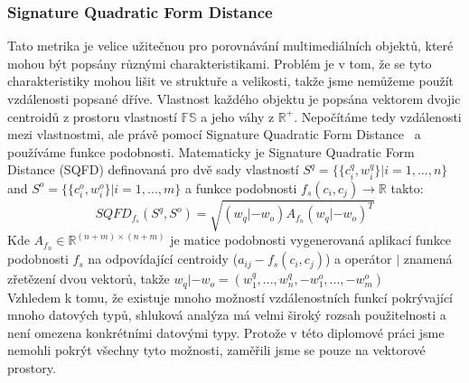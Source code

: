 \subsubsection{Signature Quadratic Form Distance}
Tato metrika je velice užitečnou pro porovnávání multimediálních objektů, které mohou být popsány různými charakteristikami. Problém je v tom, že se tyto charakteristiky mohou lišit ve struktuře a velikosti, takže jsme nemůžeme použít vzdálenosti popsané dříve. Vlastnost každého objektu je popsána vektorem dvojic centroidů z prostoru vlastností $\mathbb{FS}$ a jeho váhy z $\mathbb{R^{+}}$.
Nepočítáme tedy vzdálenosti mezi vlastnostmi, ale právě pomocí Signature Quadratic Form Distance~\cite{Beecks10} a používáme funkce podobnosti.
Matematicky je Signature Quadratic Form Distance (SQFD) definovaná pro dvě sady vlastností $S^{q} = \{\{c_i^q, w_i^q\}|i=1,...,n\}$ and $S^{o} = \{\{c_i^o, w_i^o\}|i=1,...,m\}$ a funkce podobnosti $f_s(c_i, c_j)\to \mathbb{R}$ takto:
$$SQFD_{f_s}(S^q,S^o)=\sqrt{(w_q|-w_o)A_{f_n}(w_q|-w_o)^T}$$
Kde $A_{f_n} \in \mathbb{R}^{(n+m)\times(n+m)}$ je matice podobnosti vygenerovaná aplikací funkce podobnosti $f_s$ na odpovídající centroidy  ($a_{ij}-f_s(c_i,c_j)$) a operátor $|$ znamená zřetězení dvou vektorů, takže $w_q|-w_o = (w_1^q,...,w_n^q,-w_1^o,...,-w_m^o)$\\

Vzhledem k tomu, že existuje mnoho možností vzdálenostních funkcí pokrývající mnoho datových typů, shluková analýza má velmi široký rozsah použitelnosti a není omezena konkrétními datovými typy. Protože v této diplomové práci jsme nemohli pokrýt všechny tyto možnosti, zaměřili jsme se pouze na vektorové prostory.

